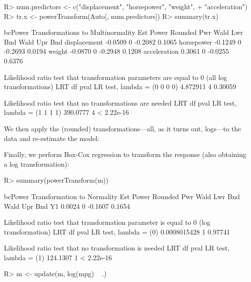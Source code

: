 \documentclass[
]{jss}
\begin{document}
\begin{CodeChunk}
\begin{CodeInput}
R> num.predictors <- c("displacement", "horsepower", "weight", 
+                     "acceleration")
R> tr.x <- powerTransform(Auto[, num.predictors])
R> summary(tr.x)
\end{CodeInput}
\begin{CodeOutput}
bcPower Transformations to Multinormality 
             Est Power Rounded Pwr Wald Lwr Bnd Wald Upr Bnd
displacement   -0.0509           0      -0.2082       0.1065
horsepower     -0.1249           0      -0.2693       0.0194
weight         -0.0870           0      -0.2948       0.1208
acceleration    0.3061           0      -0.0255       0.6376

Likelihood ratio test that transformation parameters are equal to 0
 (all log transformations)
                                 LRT df    pval
LR test, lambda = (0 0 0 0) 4.872911  4 0.30059

Likelihood ratio test that no transformations are needed
                                 LRT df       pval
LR test, lambda = (1 1 1 1) 390.0777  4 < 2.22e-16
\end{CodeOutput}
\end{CodeChunk}

We then apply the (rounded) transformations---all, as it turns out,
logs---to the data and re-estimate the model:

\begin{CodeChunk}
\end{CodeChunk}

Finally, we perform Box-Cox regression to transform the response (also
obtaining a log transformation):

\begin{CodeChunk}
\begin{CodeInput}
R> summary(powerTransform(m))
\end{CodeInput}
\begin{CodeOutput}
bcPower Transformation to Normality 
   Est Power Rounded Pwr Wald Lwr Bnd Wald Upr Bnd
Y1    0.0024           0      -0.1607       0.1654

Likelihood ratio test that transformation parameter is equal to 0
 (log transformation)
                               LRT df    pval
LR test, lambda = (0) 0.0008015428  1 0.97741

Likelihood ratio test that no transformation is needed
                           LRT df       pval
LR test, lambda = (1) 124.1307  1 < 2.22e-16
\end{CodeOutput}
\begin{CodeInput}
R> m <- update(m, log(mpg) ~ .)
\end{CodeInput}
\end{CodeChunk}
\end{document}
